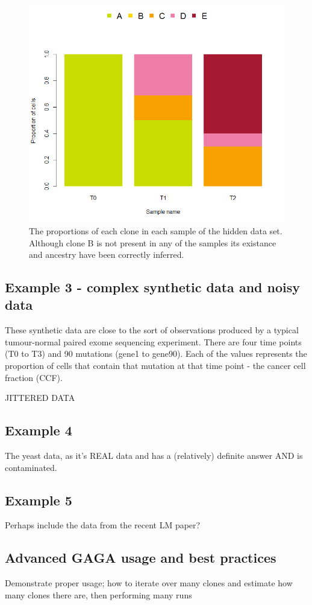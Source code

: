 \documentclass{article}
\begin{document}
\begin{figure}[H]
   \centering
       \includegraphics{gaga_hidden_data_proportions}
   \caption{The proportions of each clone in each sample of the hidden data set.  Although clone B is not present in any of the samples its existance and ancestry have been correctly inferred.}
\end{figure}

\subsection{Example 3 - complex synthetic data and noisy data}
These synthetic data are close to the sort of observations produced by a typical tumour-normal paired exome sequencing experiment.  There are four time points (T0 to T3) and 90 mutations (gene1 to gene90).  Each of the values represents the proportion of cells that contain that mutation at that time point - the cancer cell fraction (CCF).




JITTERED DATA

\subsection{Example 4}
The yeast data, as it's REAL data and has a (relatively) definite answer AND is contaminated.
\subsection{Example 5}
Perhaps include the data from the recent LM paper?
\subsection{Advanced GAGA usage and best practices}
Demonstrate proper usage; how to iterate over many clones and estimate how many clones there are, then performing many runs
\end{document}
